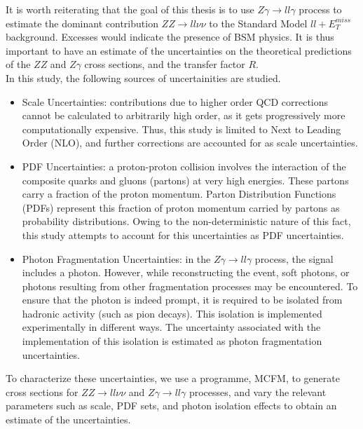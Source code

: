 \documentclass[11pt,a4paper,openright,twoside]{report}
\newcommand{\ZZ}{$ZZ\to ll\nu\nu$ }
\newcommand{\Zg}{$Z\gamma\to ll\gamma$ }
\newcommand{\llM}{$ll+E_T^{miss}$ }
\begin{document}
It is worth reiterating that the goal of this thesis is to use \Zg process to estimate the dominant contribution \ZZ to the Standard Model \llM background. Excesses would indicate the presence of BSM physics. It is thus important to have an estimate of the uncertainties on the theoretical predictions of the $ZZ$ and $Z\gamma$ cross sections, and the transfer factor $R$.\\
In this study, the following sources of uncertainities are studied.
\begin{itemize}
\item Scale Uncertainties: contributions due to higher order QCD corrections cannot be calculated to arbitrarily high order, as it gets progressively more computationally expensive. Thus, this study is limited to Next to Leading Order (NLO), and further corrections are accounted for as scale uncertainties.
\item PDF Uncertainties: a proton-proton collision involves the interaction of the composite quarks and gluons (partons) at very high energies. These partons carry a fraction of the proton momentum. Parton Distribution Functions (PDFs) represent this fraction of proton momentum carried by partons as probability distributions. Owing to the non-deterministic nature of this fact, this study attempts to account for this uncertainties as PDF uncertainties.
\item Photon Fragmentation Uncertainties: in the \Zg process, the signal includes a photon. However, while reconstructing the event, soft photons, or photons resulting from other fragmentation processes may be encountered. To ensure that the photon is indeed prompt, it is required to be isolated from hadronic activity (such as pion decays). This isolation is implemented experimentally in different ways. The uncertainty associated with the implementation of this isolation is estimated as photon fragmentation uncertainties.
\end{itemize}

To characterize these uncertainties, we use a programme, MCFM, to generate cross sections for \ZZ and \Zg processes, and vary the relevant parameters such as scale, PDF sets, and photon isolation effects to obtain an estimate of the uncertainties.

\newpage
\end{document}
